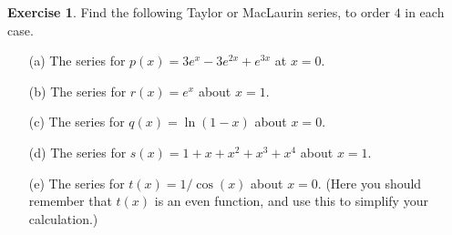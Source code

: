 \documentclass[a4paper]{amsart}
\theoremstyle{definition}
\newtheorem{exercise}{Exercise}[section]
\begin{document}
\begin{exercise}\label{ex-taylor-misc}
 Find the following Taylor or MacLaurin series, to order $4$
 in each case.
 \begin{itemize}
  \item[(a)] The series for $p(x)=3e^x-3e^{2x}+e^{3x}$ at $x=0$.
  \item[(b)] The series for $r(x)=e^x$ about $x=1$.
  \item[(c)] The series for $q(x)=\ln(1-x)$ about $x=0$.
  \item[(d)] The series for $s(x)=1+x+x^2+x^3+x^4$ about $x=1$.
  \item[(e)] The series for $t(x)=1/\cos(x)$ about $x=0$.  (Here you
   should remember that $t(x)$ is an even function, and use this to
   simplify your calculation.)
 \end{itemize}
\end{exercise}
\end{document}
